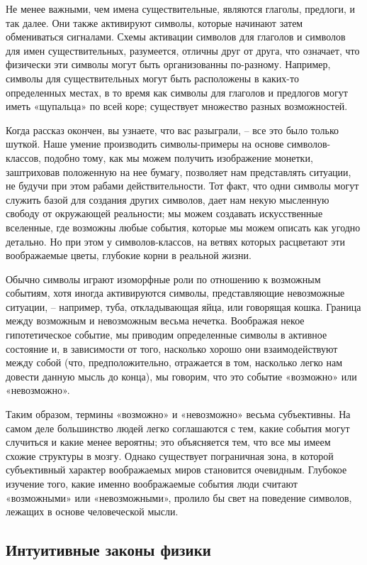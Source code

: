 \documentclass[../main.tex]{subfiles}
\begin{document}
Не менее важными, чем имена существительные, являются глаголы, предлоги, и так далее. Они также активируют символы, которые начинают затем обмениваться сигналами. Схемы активации символов для глаголов и символов для имен существительных, разумеется, отличны друг от друга, что означает, что физически эти символы могут быть организованны по-разному. Например, символы для существительных могут быть расположены в каких-то определенных местах, в то время как символы для глаголов и предлогов могут иметь «щупальца» по всей коре; существует множество разных возможностей.

Когда рассказ окончен, вы узнаете, что вас разыграли, \--- все это было только шуткой. Наше умение производить символы-примеры на основе символов-классов, подобно тому, как мы можем получить изображение монетки, заштриховав положенную на нее бумагу, позволяет нам представлять ситуации, не будучи при этом рабами действительности. Тот факт, что одни символы могут служить базой для создания других символов, дает нам некую мысленную свободу от окружающей реальности; мы можем создавать искусственные вселенные, где возможны любые события, которые мы можем описать как угодно детально. Но при этом у символов-классов, на ветвях которых расцветают эти воображаемые цветы, глубокие корни в реальной жизни.

Обычно символы играют изоморфные роли по отношению к возможным событиям, хотя иногда активируются символы, представляющие невозможные ситуации, \--- например, туба, откладывающая яйца, или говорящая кошка. Граница между возможным и невозможным весьма нечетка. Воображая некое гипотетическое событие, мы приводим определенные символы в активное состояние и, в зависимости от того, насколько хорошо они взаимодействуют между собой (что, предположительно, отражается в том, насколько легко нам довести данную мысль до конца), мы говорим, что это событие «возможно» или «невозможно».

Таким образом, термины «возможно» и «невозможно» весьма субъективны. На самом деле большинство людей легко соглашаются с тем, какие события могут случиться и какие менее вероятны; это объясняется тем, что все мы имеем схожие структуры в мозгу. Однако существует пограничная зона, в которой субъективный характер воображаемых миров становится очевидным. Глубокое изучение того, какие именно воображаемые события люди считают «возможными» или «невозможными», пролило бы свет на поведение символов, лежащих в основе человеческой мысли.


\subsection{Интуитивные законы физики}
\end{document}
